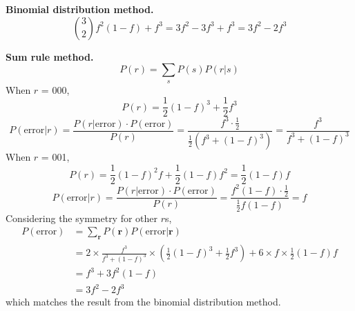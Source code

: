 \documentclass[12pt, a4paper]{article}
\begin{document}
\begin{sol}
    \textbf{Binomial distribution method.} $$\binom{3}{2} f^2 (1-f) + f^3 = 3f^2 - 3f^3 + f^3 = 3f^2 - 2f^3$$

    \textbf{Sum rule method.}
    $$P(r) = \sum_{s}P(s)P(r|s)$$
    When $r$ = 000,
    $$P(r) = \frac{1}{2}(1-f)^3 + \frac{1}{2}f^3$$
    $$P(\text{error}|r) = \frac{P(r|\text{error}) \cdot P(\text{error})}{P(r)} = \frac{f^3 \cdot \frac{1}{2}}{\frac{1}{2}(f^3 + (1-f)^3)} = \frac{f^3}{f^3 + (1-f)^3}$$
    When $r$ = 001, 
    $$P(r) = \frac{1}{2}(1-f)^2f + \frac{1}{2}(1-f)f^2 = \frac{1}{2} (1-f)f$$
    $$P(\text{error}|r) = \frac{P(r|\text{error}) \cdot P(\text{error})}{P(r)} = \frac{f^2(1-f) \cdot \frac{1}{2}}{\frac{1}{2}f(1-f)} = f$$
    Considering the symmetry for other $r$s, 
    \begin{align*}
        P(\text{error}) &= \sum_{\mathbf{r}} P(\mathbf{r})P(\text{error}|\mathbf{r}) \\
        &= 2 \times \frac{f^3}{f^3 + (1-f)^3} \times (\frac{1}{2}(1-f)^3 + \frac{1}{2}f^3) + 6 \times f \times \frac{1}{2}(1-f)f \\
        &= f^3 + 3f^2(1-f) \\
        &= 3f^2 - 2f^3
    \end{align*}
    which matches the result from the binomial distribution method.


\end{sol}
\bigskip
\end{document}
